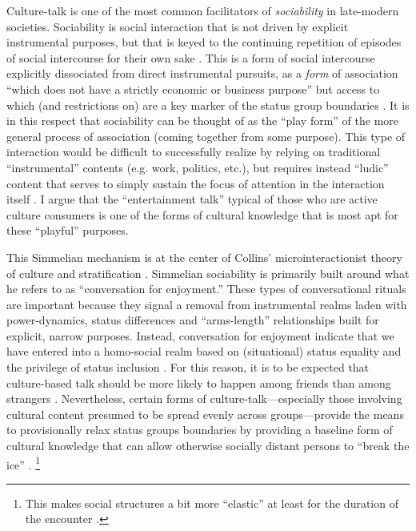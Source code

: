 \documentclass[11pt]{article}
\begin{document}
Culture-talk is one of the most common facilitators of \emph{sociability} in late-modern societies.  Sociability is social interaction that is not driven by explicit instrumental purposes, but that is keyed to the continuing repetition of episodes of social intercourse for their own sake \citep{simmel49}. This is a form of social intercourse explicitly dissociated from direct instrumental pursuits, as a \emph{form} of association ``which does not have a strictly economic or business purpose'' but access to which (and restrictions on) are a key marker of the status group boundaries \citep[114]{weber94}. It is in this respect that sociability can be thought of as the ``play form''  \citep{simmel49} of the more general process of association (coming together from some purpose).  This type of interaction would be difficult to successfully realize by relying on traditional ``instrumental'' contents (e.g. work, politics, etc.), but requires instead ``ludic'' content that serves to simply sustain the focus of attention in the interaction itself \citep{collins04}.  I argue that the ``entertainment talk'' typical of those who are active culture consumers is one of the forms of cultural knowledge that is most apt for these ``playful'' purposes.

This Simmelian mechanism is at the center of Collins' microinteractionist theory of culture and stratification \citep{collins75, collins81, collins00, collins04}.  Simmelian sociability is primarily built around what he refers to as ``conversation for enjoyment.''  These types of conversational rituals are important because they signal a removal from instrumental realms laden with power-dynamics,  status differences and ``arms-length'' relationships built for explicit, narrow purposes.  Instead, conversation for enjoyment indicate that we have entered  into a homo-social realm based on (situational) status equality and the privilege of status inclusion \citep{milner04}.  For this reason, it is to be expected  that culture-based talk should be more likely to happen among friends than among strangers \citep[124]{collins75}.  Nevertheless, certain forms of culture-talk---especially those involving cultural content presumed to be spread evenly across groups---provide the means to provisionally relax status groups boundaries by providing a baseline form of cultural knowledge that can allow otherwise socially distant persons to ``break the ice'' \citep{erickson96}. \footnote{This makes social structures a bit more ``elastic'' at least for the duration of the encounter \citep[85]{goffman66}.}
\end{document}
